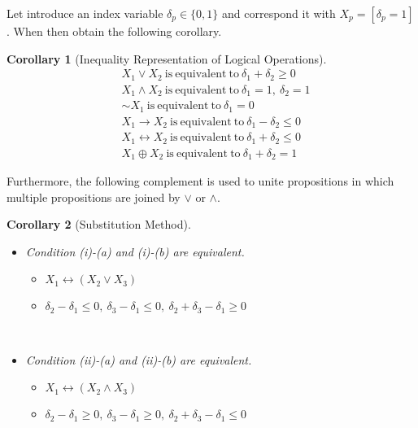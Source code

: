 \documentclass[]{interact}
\theoremstyle{plain}%
\newtheorem{theorem}{Theorem}[section]
\newtheorem{corollary}[theorem]{Corollary}
\theoremstyle{definition}
\theoremstyle{remark}
\begin{document}
Let introduce an index variable $\delta_p\in\{0,1\}$ and correspond it with $X_p=[\delta_p=1]$.
When then obtain the following corollary.
\begin{corollary}[Inequality Representation of Logical Operations]
    \label{col:Inequality}
    \begin{align}
        &X_1\vee X_2~\mathrm{is~equivalent~to}~\delta_1 + \delta_2 \ge 0\\
        &X_1\wedge X_2~\mathrm{is~equivalent~to}~\delta_1=1,~\delta_2=1\\
        &\sim X_1~\mathrm{is~equivalent~to}~\delta_1 = 0\\
        &X_1\rightarrow X_2~\mathrm{is~equivalent~to}~\delta_1 - \delta_2 \le 0\\
        &X_1\leftrightarrow X_2~\mathrm{is~equivalent~to}~\delta_1 + \delta_2 \le 0\\
        &X_1\oplus X_2~\mathrm{is~equivalent~to}~\delta_1 + \delta_2 = 1
    \end{align}
\end{corollary}
Furthermore, the following complement is used to unite propositions in which multiple propositions are joined by $\vee$ or $\wedge$.
\begin{corollary}[Substitution Method]\mbox{}\\
    \label{col:Substitution}
    \begin{itemize}
        \item[(i)] Condition (i)-(a) and (i)-(b) are equivalent.\mbox{}\\
            \begin{itemize}
                \item[(a)]$X_1\leftrightarrow(X_2\vee X_3)$\\
                \item[(b)] $\delta_2-\delta_1\le 0,~\delta_3-\delta_1\le 0,~\delta_2+\delta_3-\delta_1\ge 0$
            \end{itemize}
            \mbox{}\\
        \item[(ii)] Condition (ii)-(a) and (ii)-(b) are equivalent.\mbox{}\\
            \begin{itemize}
                \item[(a)]$X_1\leftrightarrow(X_2\wedge X_3)$\\
                \item[(b)] $\delta_2-\delta_1\ge 0,~\delta_3-\delta_1\ge 0,~\delta_2+\delta_3-\delta_1\le 0$
            \end{itemize}
            \mbox{}\\
    \end{itemize}
\end{corollary}
    
\end{document}
